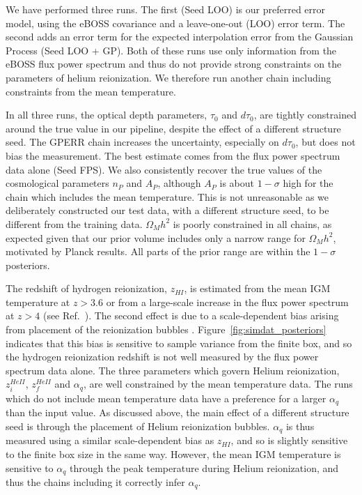 We have performed three runs.
The first (Seed LOO) is our preferred error model, using the eBOSS covariance and a leave-one-out (LOO) error term.
The second adds an error term for the expected interpolation error from the Gaussian Process (Seed LOO + GP).
Both of these runs use only information from the eBOSS flux power spectrum and thus do not provide strong constraints on the parameters of helium reionization.
We therefore run another chain including constraints from the mean temperature.

In all three runs, the optical depth parameters, $\tau_0$ and $d\tau_0$, are tightly constrained around the true value in our pipeline, despite the effect of a different structure seed. The GPERR chain increases the uncertainty, especially on $d\tau_0$, but does not bias the measurement.
The best estimate comes from the flux power spectrum data alone (Seed FPS).
We also consistently recover the true values of the cosmological parameters $n_P$ and $A_P$, although $A_P$ is about $1-\sigma$ high for the chain which includes the mean temperature.
This is not unreasonable as we deliberately constructed our test data, with a different structure seed, to be different from the training data.
$\Omega_M h^2$ is poorly constrained in all chains, as expected given that our prior volume includes only a narrow range for $\Omega_M h^2$, motivated by Planck results.
All parts of the prior range are within the $1-\sigma$ posteriors.

The redshift of hydrogen reionization, $z_{HI}$, is estimated from the mean IGM temperature at $z > 3.6$ or from a large-scale increase in the flux power spectrum at $z > 4$ (see Ref.~\cite{2023simsuite}).
The second effect is due to a scale-dependent bias arising from placement of the reionization bubbles \cite{Montero:2019}.
Figure~\ref{fig:simdat_posteriors} indicates that this bias is sensitive to sample variance from the finite box, and so the hydrogen reionization redshift is not well measured by the flux power spectrum data alone.
The three parameters which govern Helium reionization, $z_i^{HeII}$, $z_f^{HeII}$ and $\alpha_q$, are well constrained by the mean temperature data.
The runs which do not include mean temperature data have a preference for a larger $\alpha_q$ than the input value.
As discussed above, the main effect of a different structure seed is through the placement of Helium reionization bubbles.
$\alpha_q$ is thus measured using a similar scale-dependent bias as $z_{HI}$, and so is slightly sensitive to the finite box size in the same way.
However, the mean IGM temperature is sensitive to $\alpha_q$ through the peak temperature during Helium reionization, and thus the chains including it correctly infer $\alpha_q$.

